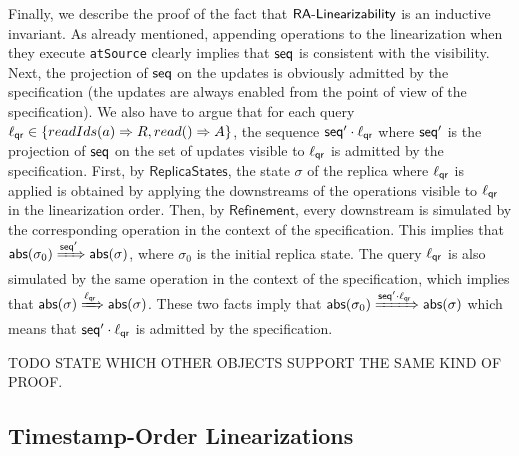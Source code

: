Finally, we describe the proof of the fact that $\mathsf{\CRDTLinshort{}}$ is an inductive invariant. As already mentioned, appending operations to the linearization when they execute {\tt atSource} clearly implies that $\aseqord$ is consistent with the visibility. Next, the projection of $\aseqord$ on the updates is obviously admitted by the specification (the updates are always enabled from the point of view of the specification). 
We also have to argue that for each query $\alabel_{\mathsf{qr}}\in\{\alabellongind[readIds]{a}{R}{},\alabellongind[read]{}{A}{}\}$, the sequence $\aseqord'\cdot \alabel_{\mathsf{qr}}$ where $\aseqord'$ is the projection of $\aseqord$ on the set of updates 
visible to $\alabel_{\mathsf{qr}}$ is admitted by the specification. First, by $\mathsf{ReplicaStates}$, the state $\sigma$ of the replica where $\alabel_{\mathsf{qr}}$ is applied is obtained by applying the downstreams of the operations visible to $\alabel_{\mathsf{qr}}$ in the linearization order. Then, by $\mathsf{Refinement}$, every downstream is simulated by the corresponding operation in the context of the specification. This implies that $\refmap(\sigma_0)\xRightarrow{\aseqord'}\refmap(\sigma)$, where $\sigma_0$ is the initial replica state. The query $\alabel_{\mathsf{qr}}$ is also simulated by the same operation in the context of the specification, which implies that $\refmap(\sigma)\xRightarrow{\alabel_{\mathsf{qr}}}\refmap(\sigma)$. These two facts imply that $\refmap(\sigma_0)\xRightarrow{\aseqord'\cdot \alabel_{\mathsf{qr}}}\refmap(\sigma)$ which means that $\aseqord'\cdot \alabel_{\mathsf{qr}}$ is admitted by the specification.

TODO STATE WHICH OTHER OBJECTS SUPPORT THE SAME KIND OF PROOF.

\subsection{Timestamp-Order Linearizations}
\label{subsec:time-stamp order as linearizabtion} 

